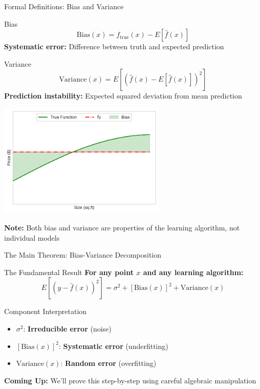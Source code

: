 \documentclass[10pt]{beamer}
\newcommand{\fitpic}[1]{\begin{adjustbox}{max width=\linewidth, max totalheight=0.78\textheight}#1\end{adjustbox}}
\begin{document}
\begin{frame}{Formal Definitions: Bias and Variance}
\begin{definitionbox}{Bias}
$$\text{Bias}(x) = f_{\text{true}}(x) - E[\hat{f}(x)]$$
\textbf{Systematic error:} Difference between truth and expected prediction
\end{definitionbox}

\begin{definitionbox}{Variance}
$$\text{Variance}(x) = E[(\hat{f}(x) - E[\hat{f}(x)])^2]$$
\textbf{Prediction instability:} Expected squared deviation from mean prediction
\end{definitionbox}

\begin{center}
\fitpic{\includegraphics[width=0.6\textwidth]{../assets/bias-variance/figures/bias6.pdf}}
\end{center}

\begin{keypointsbox}
\textbf{Note:} Both bias and variance are properties of the learning algorithm, not individual models
\end{keypointsbox}
\end{frame}

\begin{frame}{The Main Theorem: Bias-Variance Decomposition}
\begin{alertbox}{The Fundamental Result}
\textbf{For any point $x$ and any learning algorithm:}
$$E[(y - \hat{f}(x))^2] = \sigma^2 + [\text{Bias}(x)]^2 + \text{Variance}(x)$$
\end{alertbox}

\begin{definitionbox}{Component Interpretation}
\begin{itemize}
\item $\sigma^2$: \textbf{Irreducible error} (noise)
\item $[\text{Bias}(x)]^2$: \textbf{Systematic error} (underfitting)
\item $\text{Variance}(x)$: \textbf{Random error} (overfitting)
\end{itemize}
\end{definitionbox}

\begin{keypointsbox}
\textbf{Coming Up:} We'll prove this step-by-step using careful algebraic manipulation
\end{keypointsbox}
\end{frame}
\end{document}
